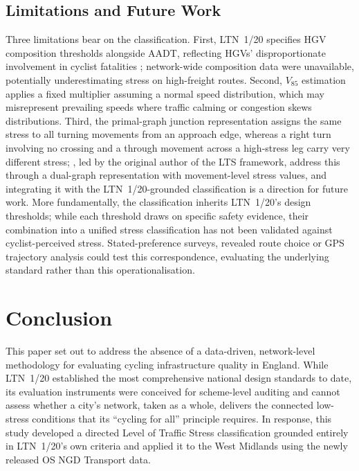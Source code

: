 \documentclass[final,5p,times,twocolumn,authoryear]{elsarticle}
\begin{document}
\subsection{Limitations and Future Work}
\label{sec:disc-limitations}
Three limitations bear on the classification. First, LTN~1/20 specifies HGV composition thresholds alongside AADT, reflecting HGVs' disproportionate involvement in cyclist fatalities \citep{morgan2010, chao2025}; network-wide composition data were unavailable, potentially underestimating stress on high-freight routes. Second, $V_{85}$ estimation applies a fixed multiplier assuming a normal speed distribution, which may misrepresent prevailing speeds where traffic calming or congestion skews distributions. Third, the primal-graph junction representation assigns the same stress to all turning movements from an approach edge, whereas a right turn involving no crossing and a through movement across a high-stress leg carry very different stress; \citet{furth2026}, led by the original author of the LTS framework, address this through a dual-graph representation with movement-level stress values, and integrating it with the LTN~1/20-grounded classification is a direction for future work. More fundamentally, the classification inherits LTN~1/20's design thresholds; while each threshold draws on specific safety evidence, their combination into a unified stress classification has not been validated against cyclist-perceived stress. Stated-preference surveys, revealed route choice or GPS trajectory analysis could test this correspondence, evaluating the underlying standard rather than this operationalisation.


\section{Conclusion}
\label{sec:conclusion}
This paper set out to address the absence of a data-driven,
network-level methodology for evaluating cycling infrastructure quality in
England. While LTN~1/20 established the most comprehensive national design
standards to date, its evaluation instruments were conceived for scheme-level
auditing and cannot assess whether a city's network, taken as a whole, delivers
the connected low-stress conditions that its ``cycling for all'' principle
requires. In response, this study developed a directed Level of Traffic Stress
classification grounded entirely in LTN~1/20's own criteria and applied it to
the West Midlands using the newly released OS NGD Transport data.
\end{document}

